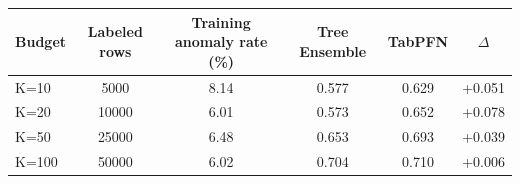 \documentclass[10pt]{article}
\begin{document}
\begin{preview}\begin{minipage}{\linewidth}
\centering
{}
\label{tab:m5-exp-b-results}
\begin{tabular}{lS[table-format=5.0]S[table-format=2.2]S[table-format=1.3]S[table-format=1.3]S[table-format=+1.3]}
\toprule
Budget & {Labeled rows} & {Training anomaly rate (\%)} & {Tree Ensemble} & {TabPFN} & {$\Delta$} \\
\midrule
K=10 & 5000 & 8.14 & 0.577 & 0.629 & +0.051 \\
K=20 & 10000 & 6.01 & 0.573 & 0.652 & +0.078 \\
K=50 & 25000 & 6.48 & 0.653 & 0.693 & +0.039 \\
K=100 & 50000 & 6.02 & 0.704 & 0.710 & +0.006 \\
\bottomrule
\end{tabular}
\end{minipage}\end{preview}
\end{document}
